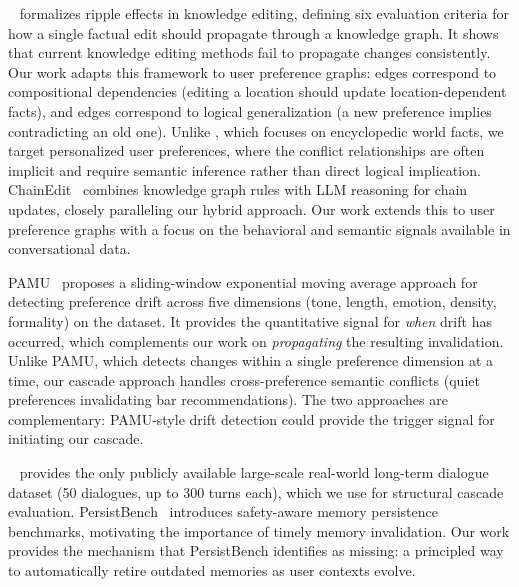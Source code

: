 \rippledits~\cite{cohen2023rippleedits} formalizes ripple effects in knowledge editing, defining six evaluation criteria for how a single factual edit should propagate through a knowledge graph. It shows that current knowledge editing methods fail to propagate changes consistently. Our work adapts this framework to user preference graphs: \locatedin edges correspond to compositional dependencies (editing a location should update location-dependent facts), and \conflictswith edges correspond to logical generalization (a new preference implies contradicting an old one). Unlike \rippledits, which focuses on encyclopedic world facts, we target personalized user preferences, where the conflict relationships are often implicit and require semantic inference rather than direct logical implication. ChainEdit~\cite{ChainEdit2025} combines knowledge graph rules with LLM reasoning for chain updates, closely paralleling our hybrid approach. Our work extends this to user preference graphs with a focus on the behavioral and semantic signals available in conversational data.

PAMU~\cite{sun2025pamu} proposes a sliding-window exponential moving average approach for detecting preference drift across five dimensions (tone, length, emotion, density, formality) on the \locomo dataset. It provides the quantitative signal for \textit{when} drift has occurred, which complements our work on \textit{propagating} the resulting invalidation. Unlike PAMU, which detects changes within a single preference dimension at a time, our cascade approach handles cross-preference semantic conflicts (\eg quiet preferences invalidating bar recommendations). The two approaches are complementary: PAMU-style drift detection could provide the trigger signal for initiating our cascade.

\locomo~\cite{maharana2024locomo} provides the only publicly available large-scale real-world long-term dialogue dataset (50 dialogues, up to 300 turns each), which we use for structural cascade evaluation. PersistBench~\cite{persistbench2026} introduces safety-aware memory persistence benchmarks, motivating the importance of timely memory invalidation. Our work provides the mechanism that PersistBench identifies as missing: a principled way to automatically retire outdated memories as user contexts evolve.
